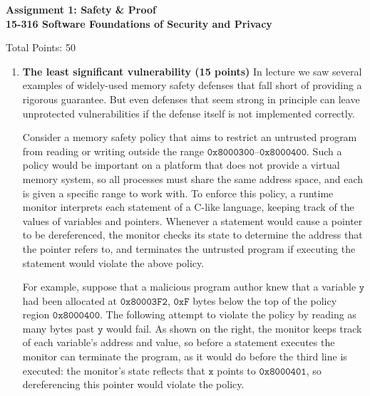 \documentclass[10pt]{article}
\begin{document}
\begin{center}
\textbf{ Assignment 1: Safety \& Proof\\15-316 Software Foundations of Security and Privacy}\\
\end{center}
Total Points: 50

\vspace{-5mm}

\begin{enumerate}

\item \textbf{The least significant vulnerability (15 points)}
In lecture we saw several examples of widely-used memory safety defenses that fall short of providing a rigorous guarantee.
But even defenses that seem strong in principle can leave unprotected vulnerabilities if the defense itself is not implemented correctly.

Consider a memory safety policy that aims to restrict an untrusted program from reading or writing outside the range $\mathtt{0x8000300}$--$\mathtt{0x8000400}$.
Such a policy would be important on a platform that does not provide a virtual memory system, so all processes must share the same address space, and each is given a specific range to work with.
To enforce this policy, a runtime monitor interprets each statement of a C-like language, keeping track of the values of variables and pointers.
Whenever a statement would cause a pointer to be dereferenced, the monitor checks its state to determine the address that the pointer refers to, and terminates the untrusted program if executing the statement would violate the above policy.

For example, suppose that a malicious program author knew that a variable $\mathtt{y}$ had been allocated at $\mathtt{0x80003F2}$, $\mathtt{0xF}$ bytes below the top of the policy region $\mathtt{0x8000400}$.
The following attempt to violate the policy by reading as many bytes past $\mathtt{y}$ would fail.
As shown on the right, the monitor keeps track of each variable's address and value, so before a statement executes the monitor can terminate the program, as it would do before the third line is executed: the monitor's state reflects that $\mathtt{x}$ points to $\mathtt{0x8000401}$, so dereferencing this pointer would violate the policy.
\begin{figure}[h]
\small
\hspace*{3em}
\begin{minipage}{0.35\textwidth}
\begin{verbatim}



\end{verbatim}
\end{minipage}
\end{figure}
\end{enumerate}
\end{document}
